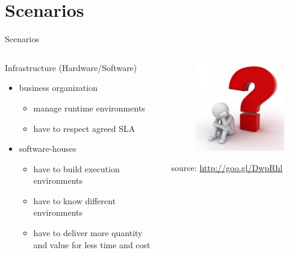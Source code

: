%
%
\section{Scenarios}
\begin{frame}{Scenarios}
	\begin{columns}
		\begin{column}{0.7\textwidth}
			Infrastructure (Hardware/Software) 
			\begin{itemize}
				\item{\footnotesize{business organization}}
				\begin{itemize}
					\item{\scriptsize{manage runtime environments}}
					\item{\scriptsize{have to respect agreed SLA}}
				\end{itemize}
				\item{\footnotesize{software-houses}}
				\begin{itemize}
					\item{\scriptsize{have to build execution environments}}
					\item{\scriptsize{have to know different environments}}
					\item{\scriptsize{have to deliver more quantity and value for less time and cost}}
				\end{itemize}
			\end{itemize}
		\end{column}
		\begin{column}{0.3\textwidth}
			\begin{figure}
				\centering{}
				\includegraphics[scale=0.3]{images/problem.png}
			\end{figure}
			\begin{flushright}
				\tiny{source: \url{http://goo.gl/DwpRhl}}
			\end{flushright}
		\end{column}
	\end{columns}
\end{frame}

